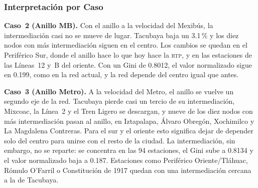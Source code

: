 \subsubsection{Interpretación por Caso}

\textbf{Caso~2 (Anillo MB).} Con el anillo a la velocidad del Mexibús, la
intermediación casi no se mueve de lugar. Tacubaya baja un 3.1\,\% y los diez
nodos con más intermediación siguen en el centro. Los cambios se quedan en el
Periférico Sur, donde el anillo hace lo que hoy hace la \textsc{rtp}, y en las
estaciones de las Líneas~12 y~B del oriente. Con un Gini de 0.8012, el valor
normalizado sigue en 0.199, como en la red actual, y la red depende del centro
igual que antes.

\textbf{Caso~3 (Anillo Metro).} A la velocidad del Metro, el anillo se vuelve
un segundo eje de la red. Tacubaya pierde casi un tercio de su intermediación,
Mixcoac, la Línea~2 y el Tren Ligero se descargan, y nueve de los diez nodos
con más intermediación pasan al anillo, en Iztapalapa, Álvaro Obregón,
Xochimilco y La Magdalena Contreras. Para el sur y el oriente esto significa
dejar de depender solo del centro para unirse con el resto de la ciudad. La
intermediación, sin embargo, no se reparte: se concentra en las 94 estaciones,
el Gini sube a 0.8134 y el valor normalizado baja a 0.187. Estaciones como
Periférico Oriente/Tláhuac, Rómulo O'Farril o Constitución de 1917 quedan con
una intermediación cercana a la de Tacubaya.
